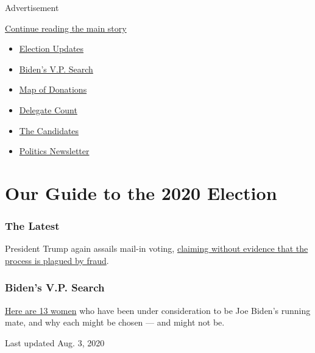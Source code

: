 Advertisement

\protect\hyperlink{after-subheader}{Continue reading the main story}

\begin{itemize}
\item
  \href{https://www.nytimes.com/2020/08/03/us/elections/biden-vs-trump.html}{Election
  Updates}
\item
  \href{https://www.nytimes.com/article/biden-vice-president-2020.html}{Biden's
  V.P. Search}
\item
  \href{https://www.nytimes.com/interactive/2020/07/24/us/politics/trump-biden-campaign-donors.html}{Map
  of Donations}
\item
  \href{https://www.nytimes.com/interactive/2020/us/elections/delegate-count-primary-results.html}{Delegate
  Count}
\item
  \href{https://www.nytimes.com/interactive/2019/us/politics/2020-presidential-candidates.html}{The
  Candidates}
\item
  \href{https://www.nytimes.com/newsletters/politics}{Politics
  Newsletter}
\end{itemize}

\hypertarget{our-guide-to-the-2020-election}{%
\section{Our Guide to the 2020
Election}\label{our-guide-to-the-2020-election}}

\hypertarget{the-latest}{%
\subsubsection{The Latest}\label{the-latest}}

President Trump again assails mail-in voting,
\href{https://www.nytimes.com/2020/08/03/us/politics/trump-mail-in-voting.html}{claiming
without evidence that the process is plagued by fraud}.

\hypertarget{bidens-vp-search}{%
\subsubsection{Biden's V.P. Search}\label{bidens-vp-search}}

\href{https://www.nytimes.com/article/biden-vice-president-2020.html}{Here
are 13 women} who have been under consideration to be Joe Biden's
running mate, and why each might be chosen --- and might not be.

Last updated Aug. 3, 2020

